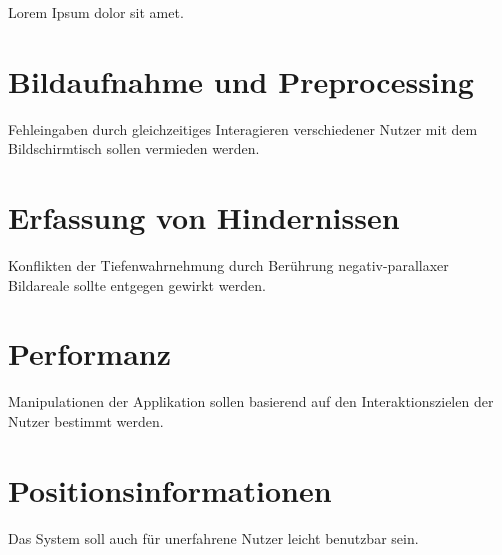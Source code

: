 Lorem Ipsum dolor sit amet.

\section{Bildaufnahme und Preprocessing}
\label{sec:bildaufnahme_preprocessing}

	\begin{anforderung}
	\label{req:mehrbenutzer}
		Fehleingaben durch gleichzeitiges Interagieren verschiedener Nutzer mit dem Bildschirmtisch sollen vermieden werden.
	\end{anforderung}

\section{Erfassung von Hindernissen}
\label{sec:erfassung_von_hindernissen}

	\begin{anforderung}
	\label{req:wahrnehmungskonflikte}
		Konflikten der Tiefenwahrnehmung durch Berührung negativ-parallaxer Bildareale sollte entgegen gewirkt werden.
	\end{anforderung}

\section{Performanz}
\label{sec:performanz}

	\begin{anforderung}
	\label{req:interaktionsziele}
		Manipulationen der Applikation sollen basierend auf den Interaktionszielen der Nutzer bestimmt werden.
	\end{anforderung}

\section{Positionsinformationen}
\label{sec:positionsinformationen}

	\begin{anforderung}
	\label{req:intuitiv_benutzbar}
		Das System soll auch für unerfahrene Nutzer leicht benutzbar sein.
	\end{anforderung}
